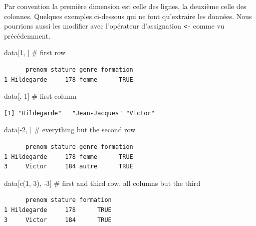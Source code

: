 \documentclass[
  letterpaper,
  DIV=11,
  numbers=noendperiod]{scrreprt}
\newenvironment{Shaded}{\begin{snugshade}}{\end{snugshade}}
\newcommand{\CommentTok}[1]{\textcolor[rgb]{0.37,0.37,0.37}{#1}}
\newcommand{\DecValTok}[1]{\textcolor[rgb]{0.68,0.00,0.00}{#1}}
\newcommand{\FunctionTok}[1]{\textcolor[rgb]{0.28,0.35,0.67}{#1}}
\newcommand{\NormalTok}[1]{\textcolor[rgb]{0.00,0.23,0.31}{#1}}
\newcommand{\SpecialCharTok}[1]{\textcolor[rgb]{0.37,0.37,0.37}{#1}}
\begin{document}
Par convention la première dimension est celle des lignes, la deuxième
celle des colonnes. Quelques exemples ci-dessous qui ne font qu'extraire
les données. Nous pourrions aussi les modifier avec l'opérateur
d'assignation \texttt{\textless{}-} comme vu précédemment.

\begin{Shaded}
\begin{Highlighting}[]
\NormalTok{data[}\DecValTok{1}\NormalTok{, ] }\CommentTok{\# first row}
\end{Highlighting}
\end{Shaded}

\begin{verbatim}
      prenom stature genre formation
1 Hildegarde     178 femme      TRUE
\end{verbatim}

\begin{Shaded}
\begin{Highlighting}[]
\NormalTok{data[, }\DecValTok{1}\NormalTok{] }\CommentTok{\# first column}
\end{Highlighting}
\end{Shaded}

\begin{verbatim}
[1] "Hildegarde"   "Jean-Jacques" "Victor"      
\end{verbatim}

\begin{Shaded}
\begin{Highlighting}[]
\NormalTok{data[}\SpecialCharTok{{-}}\DecValTok{2}\NormalTok{, ] }\CommentTok{\# everything but the second row}
\end{Highlighting}
\end{Shaded}

\begin{verbatim}
      prenom stature genre formation
1 Hildegarde     178 femme      TRUE
3     Victor     184 autre      TRUE
\end{verbatim}

\begin{Shaded}
\begin{Highlighting}[]
\NormalTok{data[}\FunctionTok{c}\NormalTok{(}\DecValTok{1}\NormalTok{, }\DecValTok{3}\NormalTok{), }\SpecialCharTok{{-}}\DecValTok{3}\NormalTok{] }\CommentTok{\# first and third row, all columns but the third}
\end{Highlighting}
\end{Shaded}

\begin{verbatim}
      prenom stature formation
1 Hildegarde     178      TRUE
3     Victor     184      TRUE
\end{verbatim}
\end{document}
